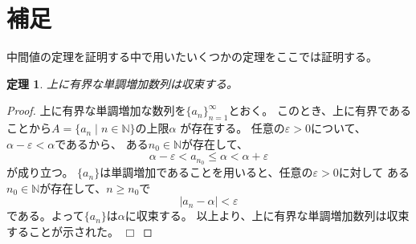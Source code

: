 \documentclass{jsarticle}
\newtheorem{theorem}{定理}
\newtheorem{proof}{証明}
\def\qed{\hfill $\Box$}
\begin{document}
\appendix
\section{補足}
中間値の定理を証明する中で用いたいくつかの定理をここでは証明する。
\begin{theorem}
上に有界な単調増加数列は収束する。
\end{theorem}
\begin{proof}
上に有界な単調増加な数列を$\{a_{n}\}_{n=1}^{\infty}$とおく。
このとき、上に有界であることから$A=\{a_{n}\mid n\in\mathbb{N}\}$の上限$\alpha$
が存在する。
任意の$\varepsilon>0$について、$\alpha-\varepsilon<\alpha$であるから、
ある$n_{0}\in\mathbb{N}$が存在して、
\[
\alpha-\varepsilon<a_{n_{0}}\leq\alpha<\alpha+\varepsilon
\]
が成り立つ。
$\{a_{n}\}$は単調増加であることを用いると、任意の$\varepsilon>0$に対して
ある$n_{0}\in\mathbb{N}$が存在して、$n\geq n_{0}$で\[
\left|a_{n}-\alpha\right|<\varepsilon
\]
である。よって$\{a_{n}\}$は$\alpha$に収束する。
以上より、上に有界な単調増加数列は収束することが示された。
\qed\end{proof}
\end{document}
